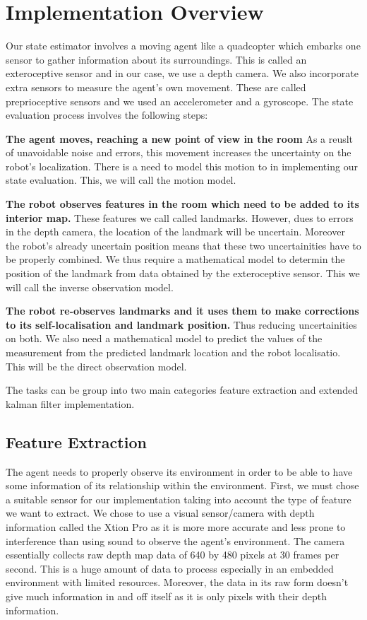 \documentclass[]{article}
\begin{document}
{%
\section{Implementation Overview}
\label{sub:implementation_overview}
Our state estimator involves a moving agent like a quadcopter which embarks one sensor to gather information about its surroundings. This is called an exteroceptive sensor and in our case, we use a depth camera. We also incorporate extra sensors to measure the agent's own movement. These are called preprioceptive sensors and we used an accelerometer and a gyroscope. The state evaluation process involves the following steps:

\textbf{The agent moves, reaching a new point of view in the room} As a reuslt of unavoidable noise
and errors, this movement increases the uncertainty on the robot's localization.
There is a need to model this motion to in implementing our state evaluation. This, we will call the motion model.

\textbf{The robot observes features in the room which need to be added to its interior map.} These features we call called landmarks. However, dues to errors in the depth camera, the location of the landmark will be uncertain. Moreover the robot's already uncertain position means that these two uncertainities have to be properly combined. We thus require a mathematical model to determin the position of the landmark from data obtained by the exteroceptive sensor. This we will call the inverse observation model.

\textbf{The robot re-observes landmarks and it uses them to  make corrections to its self-localisation and landmark position.} Thus reducing uncertainities on both. We also need a mathematical model to predict the values of the measurement from the predicted landmark location and the robot localisatio. This will be the direct observation model.

The tasks can be group into two main categories feature extraction and extended kalman filter implementation.

\subsection{Feature Extraction}
The agent needs to properly observe its environment in order to be able to have some information of its relationship within the environment. First, we must chose a suitable sensor for our implementation taking into account the type of feature we want to extract. We chose to use a visual sensor/camera with depth information called the Xtion Pro as it is more more accurate and less prone to interference than using sound to observe the agent's environment. The camera essentially collects raw depth map data of 640 by 480 pixels at 30 frames per second. This is a huge amount of data to process especially in an embedded environment with limited resources. Moreover, the data in its raw form doesn't give much information in and off itself as it is only pixels with their depth information.

}
\end{document}
